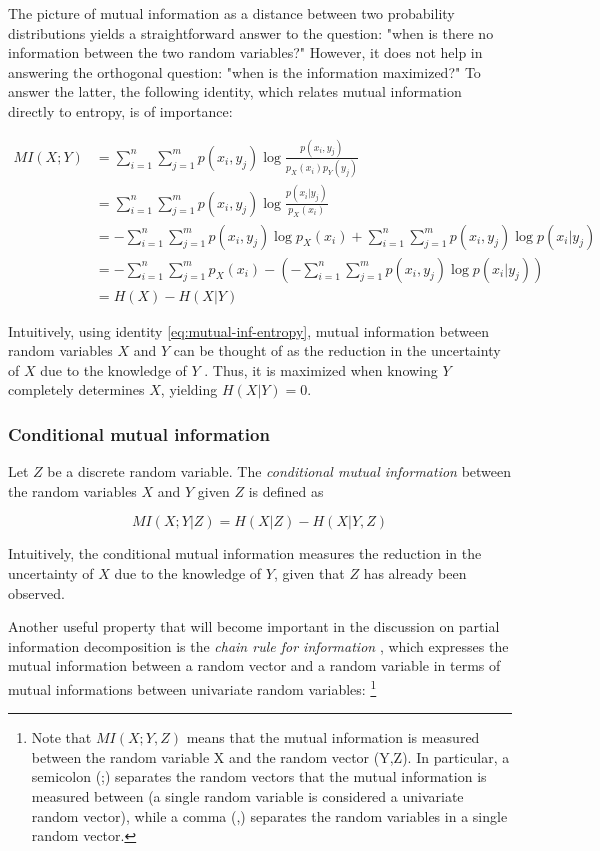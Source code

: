 \documentclass[12pt]{article}
\begin{document}
The picture of mutual information as a distance between two probability distributions yields a straightforward answer to the question: "when is there no information between the two random variables?" However, it does not help in answering the orthogonal question: "when is the information maximized?" To answer the latter, the following identity, which relates mutual information directly to entropy, is of importance: 

\begin{align}
MI(X;Y) & = \sum_{i=1}^n \sum_{j=1}^m p(x_i,y_j) \log \frac{p(x_i,y_j)}{p_X(x_i)p	_Y(y_j)} \nonumber \\
		& = \sum_{i=1}^n \sum_{j=1}^m p(x_i, y_j) \log \frac{p(x_i|y_j)}{p_X(x_i)} \nonumber \\ 
 		& = -\sum_{i=1}^n \sum_{j=1}^m p(x_i,y_j) \log p_X(x_i) +\sum_{i=1}^n \sum_{j=1}^m p(x_i,y_j) \log p(x_i|y_j) \nonumber \\
 		& = -\sum_{i=1}^n \sum_{j=1}^m p_X(x_i) - \left( - \sum_{i=1}^n \sum_{j=1}^m p(x_i,y_j) \log p(x_i|y_j) \right) \nonumber \\ 
 		& = H(X) - H(X|Y)
\label{eq:mutual-inf-entropy} 
\end{align}

Intuitively, using identity \ref{eq:mutual-inf-entropy}, mutual information between random variables $X$ and $Y$ can be thought of as the reduction in the uncertainty of $X$ due to the knowledge of $Y$ \cite{cover-thomas}. Thus, it is maximized when knowing $Y$ completely determines $X$, yielding $H(X|Y) = 0$.  

\subsubsection{Conditional mutual information}

Let $Z$ be a discrete random variable. The \textit{conditional mutual information} \cite{cover-thomas} between the random variables $X$ and $Y$ given $Z$ is defined as

\begin{equation}
MI(X;Y|Z) = H(X|Z) - H(X|Y,Z)
\end{equation}

Intuitively, the conditional mutual information measures the reduction in the uncertainty of $X$ due to the knowledge of $Y$, given that $Z$ has already been observed. 

Another useful property that will become important in the discussion on partial information decomposition is the \textit{chain rule for information} \cite{cover-thomas}, which expresses the mutual information between a random vector and a random variable in terms of mutual informations between univariate random variables: \footnote{Note that $MI(X;Y,Z)$ means that the mutual information is measured between the random variable X and the random vector (Y,Z). In particular, a semicolon (;) separates the random vectors that the mutual information is measured between (a single random variable is considered a univariate random vector), while a comma (,) separates the random variables in a single random vector.}
\end{document}
